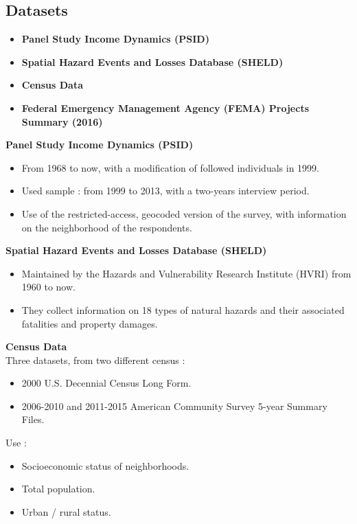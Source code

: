 \documentclass{beamer}
\begin{document}
\subsection{Datasets}
\begin{frame}{\subsecname}
\begin{itemize}
    \item \textbf{Panel Study Income Dynamics (PSID)}
    \item \textbf{Spatial Hazard Events and Losses Database (SHELD)}
    \item \textbf{Census Data} 
    \item \textbf{Federal Emergency Management Agency (FEMA) Projects Summary (2016)}
\end{itemize}
\end{frame}

\begin{frame}{\subsecname}
    \textbf{Panel Study Income Dynamics (PSID)}
    \begin{itemize}
        \item From 1968 to now, with a modification of followed individuals in 1999.
        \item Used sample : from 1999 to 2013, with a two-years interview period. 
        \item Use of the restricted-access, geocoded version of the survey, with information on the neighborhood of the respondents.
    \end{itemize}
\end{frame}

\begin{frame}{\subsecname}
    \textbf{Spatial Hazard Events and Losses Database (SHELD)}
    \begin{itemize}
        \item Maintained by the Hazards and Vulnerability Research Institute (HVRI) from 1960 to now.
        \item They collect information on 18 types of natural hazards and their associated fatalities and property damages. 
    \end{itemize}
\end{frame}

\begin{frame}{\subsecname}
    \textbf{Census Data}
    \\ Three datasets, from two different census : 
    \begin{itemize}
        \item 2000 U.S. Decennial Census Long Form.
        \item 2006-2010 and 2011-2015 American Community Survey 5-year Summary Files.
    \end{itemize}
    Use : 
    \begin{itemize}
        \item Socioeconomic status of neighborhoods.
        \item Total population. 
        \item Urban / rural status. 
    \end{itemize}
\end{frame}
\end{document}
